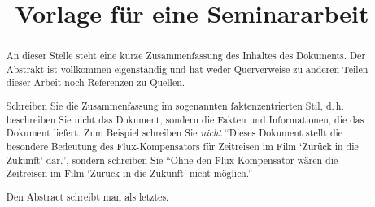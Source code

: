 \documentclass[conference,compsoc,final,a4paper]{IEEEtran}
\newcommand{\autoren}[0]{NACHNAME, VORNAME}
\newcommand{\dokumententitel}[0]{Vorlage für eine Seminararbeit}
\begin{document}
    \title{\dokumententitel}

    \author{
        \IEEEauthorblockN{\autoren}
    }

    \maketitle
    \thispagestyle{plain}
    \pagestyle{plain}


    \begin{abstract}
        An dieser Stelle steht eine kurze Zusammenfassung des Inhaltes des Dokuments. Der Abstrakt ist vollkommen eigenständig und hat weder Querverweise zu anderen Teilen dieser Arbeit noch Referenzen zu Quellen.

        Schreiben Sie die Zusammenfassung im sogenannten faktenzentrierten Stil, d.\,h. beschreiben Sie nicht das Dokument, sondern die Fakten und Informationen, die das Dokument liefert. Zum Beispiel schreiben Sie \textit{nicht} \enquote{Dieses Dokument stellt die besondere Bedeutung des Flux-Kompensators für Zeitreisen im Film \enquote{Zurück in die Zukunft} dar.}, sondern schreiben Sie \enquote{Ohne den Flux-Kompensator wären die Zeitreisen im Film \enquote{Zurück in die Zukunft} nicht möglich.}

        Den Abstract schreibt man als letztes.
    \end{abstract}

    \small\tableofcontents

\end{document}
